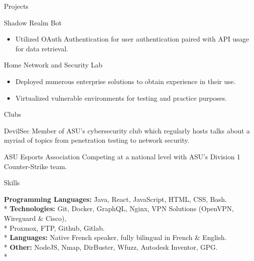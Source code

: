\documentclass{article}
\newlength{\tabin}
\newlength{\secsep}
\newcommand{\lineunder}{\vspace*{-8pt} \\ \hspace*{-6pt} \hrulefill \\ \vspace*{-15pt}}
\newenvironment{tabbedsection}[1]{
  \begin{list}{}{
      \setlength{\itemsep}{0pt}
      \setlength{\labelsep}{0pt}
      \setlength{\labelwidth}{0pt}
      \setlength{\leftmargin}{\tabin}
      \setlength{\rightmargin}{\tabin}
      \setlength{\listparindent}{0pt}
      \setlength{\parsep}{0pt}
      \setlength{\parskip}{0pt}
      \setlength{\partopsep}{0pt}
      \setlength{\topsep}{#1}
    }
  \item[]
}{\end{list}}
\newenvironment{nospacetabbing}{
    \begin{tabbing}
}{\end{tabbing}\vspace{-1.2em}}
\newenvironment{resume_section}[1]{
  \filbreak
  \vspace{2\secsep}
  \textsc{\large#1}
  \lineunder
  \begin{tabbedsection}{\secsep}
}{\end{tabbedsection}}
\newenvironment{resume_subsection}[2][]{
  \textbf{#2} \hfill {\normalsize #1} \hspace{-5em}
  \begin{tabbedsection}{0.5\secsep}
}{\end{tabbedsection}}
\newenvironment{subitems}{
  \renewcommand{\labelitemi}{-}
  \begin{itemize}
      \setlength{\labelsep}{1em}
}{\end{itemize}}
\begin{document}
\begin{resume_section}{Projects}
\begin{resume_subsection}{Shadow Realm Bot}
\begin{subitems}
			\item Utilized OAuth Authentication for user authentication paired with API usage for data retrieval.
		\end{subitems}
	\end{resume_subsection}
	\vspace{3\secsep}
  	\begin{resume_subsection}{Home Network and Security Lab}
  		\begin{subitems}
  			\item Deployed numerous enterprise solutions to obtain experience in their use.
  			\item Virtualized vulnerable environments for testing and practice purposes.
  		\end{subitems}
  	\end{resume_subsection}
\end{resume_section}

\vspace{3\secsep}

\begin{resume_section}{Clubs}
  	\begin{resume_subsection}{DevilSec}
		Member of ASU's cybersecurity club which regularly hosts talks about a myriad of topics from penetration testing to network security.
  	\end{resume_subsection}
  	\vspace{2\secsep}
  	\begin{resume_subsection}{ASU Esports Association}
  		Competing at a national level with ASU's Division 1 Counter-Strike team.
  	\end{resume_subsection}
\end{resume_section}

\vspace{3\secsep}

\begin{resume_section}{Skills}
	\begin{nospacetabbing}
  	\textbf{Programming Languages:}  \=Java, React, JavaScript, HTML, CSS, Bash.\\*
  	\textbf{Technologies:} \> Git, Docker, GraphQL, Nginx, VPN Solutions (OpenVPN, Wireguard \& Cisco),\\*
  						  \> Proxmox, FTP, Github, Gitlab.\\*
  	\textbf{Languages:} \> Native French speaker, fully bilingual in French \& English.\\*
  	\textbf{Other:} \> NodeJS, Nmap, DirBuster, Wfuzz, Autodesk Inventor, GPG.\\*
  \end{nospacetabbing}  
\end{resume_section}
\end{document}
